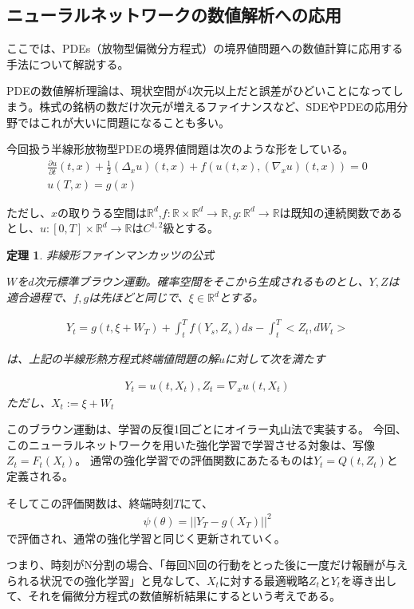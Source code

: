\documentclass[dvipdfmx, a4paper]{jsarticle}
\newtheorem{theo}{定理}[section]
\begin{document}
\subsection{ニューラルネットワークの数値解析への応用}
ここでは、PDEs（放物型偏微分方程式）の境界値問題への数値計算に応用する手法について解説する。

PDEの数値解析理論は、現状空間が4次元以上だと誤差がひどいことになってしまう。株式の銘柄の数だけ次元が増えるファイナンスなど、SDEやPDEの応用分野ではこれが大いに問題になることも多い。
 
今回扱う半線形放物型PDEの境界値問題は次のような形をしている。
\begin{align}
\frac{\partial u}{\partial t}(t,x)+\frac{1}{2}(\Delta_xu)(t,x)+f(u(t,x),(\nabla_xu)(t,x))=0\\
u(T,x)=g(x)
\end{align}


ただし、$x$の取りうる空間は$\mathbb{R}^d$,$f:\mathbb{R}\times\mathbb{R}^d\rightarrow \mathbb{R},g:\mathbb{R}^d\rightarrow\mathbb{R}$は既知の連続関数であるとし、$u:[0,T]\times\mathbb{R}^d\rightarrow \mathbb{R}$は$C^{1,2}$級とする。

\begin{theo}非線形ファインマンカッツの公式

$W$を$d$次元標準ブラウン運動。確率空間をそこから生成されるものとし、$Y,Z$は適合過程で、$f,g$は先ほどと同じで、$\xi\in\mathbb{R}^d$とする。

\begin{align}
Y_t=g(t,\xi+W_T)+\int^T_tf(Y_s,Z_s)ds-\int^T_t<Z_t,dW_t>
\end{align}

は、上記の半線形熱方程式終端値問題の解$u$に対して次を満たす

\begin{align}
Y_t=u(t,X_t),Z_t=\nabla_xu(t,X_t)
\end{align}
ただし、$X_t:=\xi+W_t$
\end{theo}

このブラウン運動は、学習の反復1回ごとにオイラー丸山法で実装する。
今回、このニューラルネットワークを用いた強化学習で学習させる対象は、写像$Z_t=F_t(X_t)$。
通常の強化学習での評価関数にあたるものは$Y_t=Q(t,Z_t)$と定義される。

そしてこの評価関数は、終端時刻$T$にて、
\begin{align}
\psi(\theta)=||Y_T-g(X_T)||^2
\end{align}
で評価され、通常の強化学習と同じく更新されていく。

つまり、時刻がN分割の場合、「毎回N回の行動をとった後に一度だけ報酬が与えられる状況での強化学習」と見なして、$X_t$に対する最適戦略$Z_t$と$Y_t$を導き出して、それを偏微分方程式の数値解析結果にするという考えである。
\end{document}
